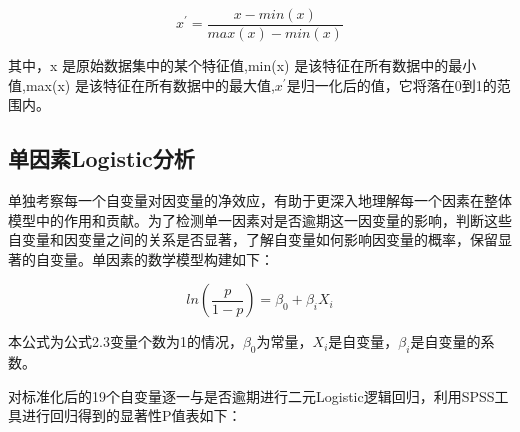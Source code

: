 \begin{equation}
	x^{'} = \frac{x - min(x)}{max(x)-min(x)} 
\end{equation}

其中，x 是原始数据集中的某个特征值,min(x) 是该特征在所有数据中的最小值,max(x) 是该特征在所有数据中的最大值,$x^{'}$是归一化后的值，它将落在0到1的范围内。

\subsection{单因素Logistic分析}
单独考察每一个自变量对因变量的净效应，有助于更深入地理解每一个因素在整体模型中的作用和贡献。为了检测单一因素对是否逾期这一因变量的影响，判断这些自变量和因变量之间的关系是否显著，了解自变量如何影响因变量的概率，保留显著的自变量。单因素的数学模型构建如下：


\begin{equation}
	ln(\frac{p}{1-p}) = \beta_0+ \beta_i X_i
\end{equation}

本公式为公式2.3变量个数为1的情况，$\beta_0$为常量，$X_i$是自变量，$\beta_i$是自变量的系数。

对标准化后的19个自变量逐一与是否逾期进行二元Logistic逻辑回归，利用SPSS工具进行回归得到的显著性P值表如下：

